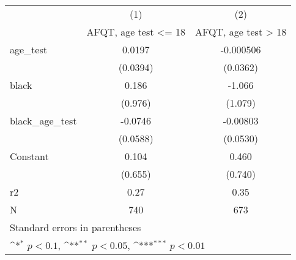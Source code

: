 {
\def\sym#1{\ifmmode^{#1}\else\(^{#1}\)\fi}
\begin{tabular}{l*{2}{c}}
\hline\hline
                                                  &\multicolumn{1}{c}{(1)}&\multicolumn{1}{c}{(2)}\\
                                                  &\multicolumn{1}{c}{AFQT, age test <= 18}&\multicolumn{1}{c}{AFQT, age test > 18}\\
\hline
age\_test                                          &   0.0197         &-0.000506         \\
                                                  & (0.0394)         & (0.0362)         \\
[1em]
black                                             &    0.186         &   -1.066         \\
                                                  &  (0.976)         &  (1.079)         \\
[1em]
black\_age\_test                                    &  -0.0746         & -0.00803         \\
                                                  & (0.0588)         & (0.0530)         \\
[1em]
Constant                                          &    0.104         &    0.460         \\
                                                  &  (0.655)         &  (0.740)         \\
\hline
r2                                                &     0.27         &     0.35         \\
N                                                 &      740         &      673         \\
\hline\hline
\multicolumn{3}{l}{\footnotesize Standard errors in parentheses}\\
\multicolumn{3}{l}{\footnotesize \sym{*} \(p<0.1\), \sym{**} \(p<0.05\), \sym{***} \(p<0.01\)}\\
\end{tabular}
}
